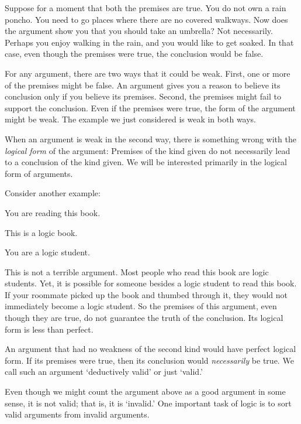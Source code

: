 Suppose for a moment that both the premises are true. You do not own a rain poncho. You need to go places where there are no covered walkways. Now does the argument show you that you should take an umbrella? Not necessarily. Perhaps you enjoy walking in the rain, and you would like to get soaked. In that case, even though the premises were true, the conclusion would be false.

For any argument, there are two ways that it could be weak. First, one or more of the premises might be false. An argument gives you a reason to believe its conclusion only if you believe its premises. Second, the premises might fail to support the conclusion. Even if the premises were true, the form of the argument might be weak. The example we just considered is weak in both ways.

When an argument is weak in the second way, there is something wrong with the \emph{logical form} of the argument: Premises of the kind given do not necessarily lead to a conclusion of the kind given. We will be interested primarily in the logical form of arguments.



Consider another example:
\begin{earg}
\item[] You are reading this book.
\item[] This is a logic book.
\item[\therefore] You are a logic student.
\end{earg}
This is not a terrible argument. Most people who read this book are logic students. Yet, it is possible for someone besides a logic student to read this book. If your roommate picked up the book and thumbed through it, they would not immediately become a logic student. So the premises of this argument, even though they are true, do not guarantee the truth of the conclusion. Its logical form is less than perfect.

An argument that had no weakness of the second kind would have perfect logical form. If its premises were true, then its conclusion would \emph{necessarily} be true. We call such an argument `deductively valid' or just `valid.'

Even though we might count the argument above as a good argument in some sense, it is not valid; that is, it is `invalid.' One important task of logic is to sort valid arguments from invalid arguments.



